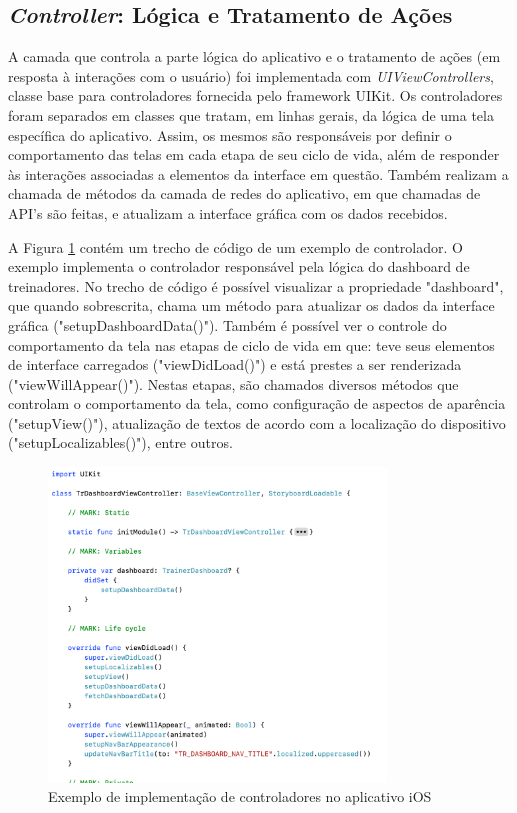 \subsection{\textit{Controller}: Lógica e Tratamento de Ações}
A camada que controla a parte lógica do aplicativo e o tratamento de ações (em resposta à interações com o usuário) foi implementada com \textit{UIViewControllers}, classe base para controladores fornecida pelo framework UIKit. Os controladores foram separados em classes que tratam, em linhas gerais, da lógica de uma tela específica do aplicativo. Assim, os mesmos são responsáveis por definir o comportamento das telas em cada etapa de seu ciclo de vida, além de responder às interações associadas a elementos da interface em questão. Também realizam a chamada de métodos da camada de redes do aplicativo, em que chamadas de API's são feitas, e atualizam a interface gráfica com os dados recebidos.

A Figura \ref{fig:controller-example} contém um trecho de código de um exemplo de controlador. O exemplo implementa o controlador responsável pela lógica do dashboard de treinadores. No trecho de código é possível visualizar a propriedade "dashboard", que quando sobrescrita, chama um método para atualizar os dados da interface gráfica ("setupDashboardData()"). Também é possível ver o controle do comportamento da tela nas etapas de ciclo de vida em que: teve seus elementos de interface carregados ("viewDidLoad()") e está prestes a ser renderizada ("viewWillAppear()"). Nestas etapas, são chamados diversos métodos que controlam o comportamento da tela, como configuração de aspectos de aparência ("setupView()"), atualização de textos de acordo com a localização do dispositivo ("setupLocalizables()"), entre outros.

\begin{figure}[H]
    \centering
    \includegraphics[width=0.8\textwidth]{pfc/figuras/ex-tr-dashboard.png}
    \caption{Exemplo de implementação de controladores no aplicativo iOS}
    \label{fig:controller-example}
\end{figure}

